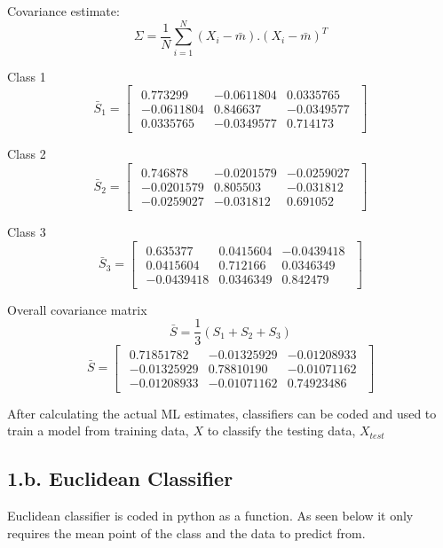 \documentclass[11pt]{article}
\begin{document}
Covariance estimate:
$$
\Sigma = \frac{1}{N} \sum_{i=1}^N (X_i-\bar{m}).(X_i-\bar{m})^T
$$

Class 1
$$
\bar{S}_1=
 \begin{bmatrix}
 \begin{array}{rrr}
 0.773299  & -0.0611804 &  0.0335765 \\
-0.0611804 &  0.846637  & -0.0349577 \\
 0.0335765 & -0.0349577 &  0.714173
\end{array}   
\end{bmatrix}
$$

Class 2
$$
\bar{S}_2=
 \begin{bmatrix}
 \begin{array}{rrr}
 0.746878  & -0.0201579 & -0.0259027 \\
-0.0201579 &  0.805503  & -0.031812  \\
-0.0259027 & -0.031812  &  0.691052
\end{array}   
\end{bmatrix}
$$

Class 3
$$
\bar{S}_3=
 \begin{bmatrix}
 \begin{array}{rrr}
 0.635377  &  0.0415604 & -0.0439418 \\
 0.0415604 &  0.712166  &  0.0346349 \\
-0.0439418 &  0.0346349 &  0.842479
\end{array}   
\end{bmatrix}
$$

Overall covariance matrix
$$
\bar{S} = \frac{1}{3}(S_1+S_2+S_3)
$$
$$
\bar{S}=
 \begin{bmatrix}
 \begin{array}{rrr}
    0.71851782 &-0.01325929  &-0.01208933 \\
   -0.01325929  &0.78810190  &-0.01071162 \\
   -0.01208933 &-0.01071162   &0.74923486 
\end{array}   
\end{bmatrix}
$$

After calculating the actual ML estimates, classifiers can be coded and used to train a model from training data, $X$ to classify the testing data, $X_{test}$

\subsection*{1.b. Euclidean Classifier}
Euclidean classifier is coded in python as a function. As seen below it only requires the mean point of the class and the data to predict from.
\end{document}
